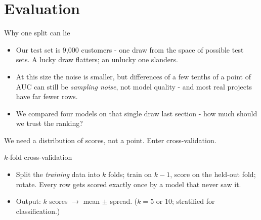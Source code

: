 \documentclass[10pt,aspectratio=169]{beamer}
\begin{document}
\section{Evaluation}

\begin{frame}{Why one split can lie}
  \begin{itemize}
    \item Our test set is 9{,}000 customers - \alert{one draw} from the
          space of possible test sets. A lucky draw flatters; an unlucky one
          slanders.
    \item At this size the noise is smaller, but differences of a few tenths
          of a point of AUC can still be \emph{sampling noise}, not model
          quality - and most real projects have far fewer rows.
    \item We compared four models on that single draw last section -
          how much should we trust the ranking?
  \end{itemize}
  \vspace{0.6em}
  \begin{center}
    We need a \alert{distribution} of scores, not a point.
    Enter cross-validation.
  \end{center}
\end{frame}

\begin{frame}{$k$-fold cross-validation}
  \begin{center}
  \end{center}
  \vspace{0.5em}
  \begin{itemize}\small
    \item Split the \emph{training} data into $k$ folds; train on $k-1$,
          score on the held-out fold; rotate. Every row gets scored
          \alert{exactly once} by a model that never saw it.
    \item Output: $k$ scores $\to$ \alert{mean $\pm$ spread}. ($k = 5$ or 10;
          stratified for classification.)
  \end{itemize}
\end{frame}
\end{document}
